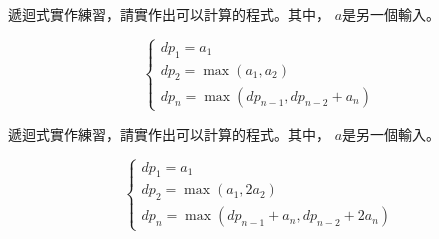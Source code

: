     \problem 遞迴式實作練習，請實作出可以計算的程式。其中，
    $a$是另一個輸入。

    $$
    \begin{cases}
        dp_1=a_1 \\
        dp_2=\max (a_1,a_2) \\
        dp_n=\max (dp_{n-1},dp_{n-2}+a_n)
    \end{cases}
    $$

    \problem 遞迴式實作練習，請實作出可以計算的程式。其中，
    $a$是另一個輸入。

    $$
    \begin{cases}
        dp_1=a_1 \\
        dp_2=\max (a_1,2a_2) \\
        dp_n=\max (dp_{n-1}+a_n,dp_{n-2}+2a_n)
    \end{cases}
    $$
